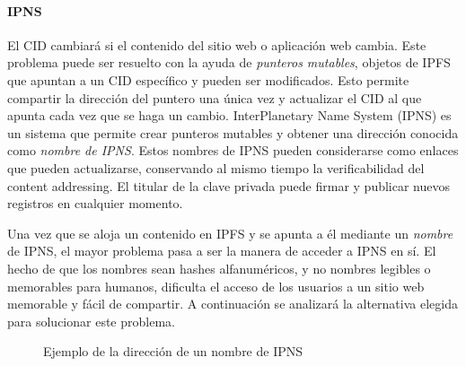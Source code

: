 
\paragraph{IPNS} El CID cambiará si el contenido del sitio web o aplicación web cambia. Este problema puede ser resuelto con la ayuda de \textit{punteros mutables}, objetos de IPFS que apuntan a un CID específico y pueden ser modificados. Esto permite compartir la dirección del puntero una única vez y actualizar el CID al que apunta cada vez que se haga un cambio. InterPlanetary Name System (IPNS) \cite{ipns} es un sistema que permite crear  punteros mutables y obtener una dirección conocida como \textit{nombre de IPNS}. Estos nombres de IPNS pueden considerarse como enlaces que pueden actualizarse, conservando al mismo tiempo la verificabilidad del content addressing. El titular de la clave privada puede firmar y publicar nuevos registros en cualquier momento.

Una vez que se aloja un contenido en IPFS y se apunta a él mediante un \textit{nombre} de IPNS, el mayor problema pasa a ser la manera de acceder a IPNS en sí. El hecho de que los nombres sean hashes alfanuméricos, y no nombres legibles o memorables para humanos, dificulta el acceso de los usuarios a un sitio web memorable y fácil de compartir. A continuación se analizará la alternativa elegida para solucionar este problema.

\begin{figure}[h]
\centering
{}
\caption{Ejemplo de la dirección de un nombre de IPNS}
\end{figure}

